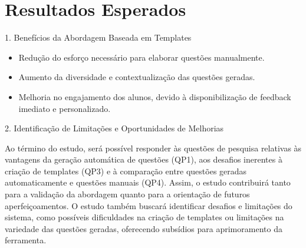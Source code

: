 \section{Resultados Esperados}

1. Benefícios da Abordagem Baseada em Templates

\begin{itemize}
    \item Redução do esforço necessário para elaborar questões manualmente.
    \item Aumento da diversidade e contextualização das questões geradas.
    \item Melhoria no engajamento dos alunos, devido à disponibilização de feedback imediato e personalizado.
\end{itemize}
2. Identificação de Limitações e Oportunidades de Melhorias


Ao término do estudo, será possível responder às questões de pesquisa relativas às vantagens da geração automática de questões (QP1), aos desafios inerentes à criação de templates (QP3) e à comparação entre questões geradas automaticamente e questões manuais (QP4). Assim, o estudo contribuirá tanto para a validação da abordagem quanto para a orientação de futuros aperfeiçoamentos. 
 O estudo também buscará identificar desafios e limitações do sistema, como possíveis dificuldades na criação de templates ou limitações na variedade das questões geradas, oferecendo subsídios para aprimoramento da ferramenta.

